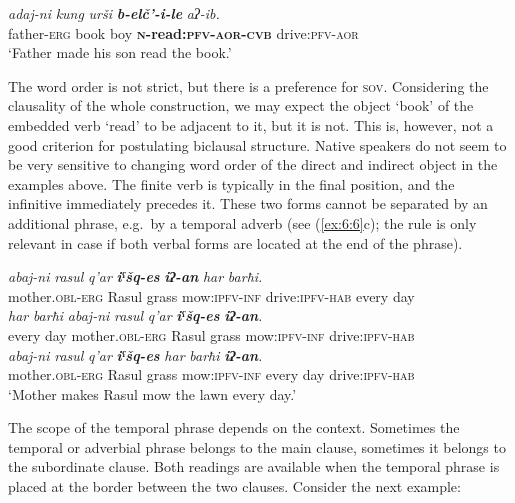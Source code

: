 ﻿\documentclass[output=paper]{langsci/langscibook}
\begin{document}
\ex %
\gll *\emph{adaj-ni} \emph{kung} \emph{urši} \emph{\textbf{b-elč'-i-le}}  \emph{aʔ-ib.}\\
father-\textsc{erg} book boy \textbf{\textsc{n}-read:\textsc{pfv}-\textsc{aor}-\textsc{cvb}} drive:\textsc{pfv}-\textsc{aor}\\
\glt `Father made his son read the book.'
\z
\z


The word order is not strict, but there is a preference for \textsc{sov}.
Considering the clausality of the whole construction, we may expect
the object `book' of the embedded verb `read' to be adjacent to it, but
it is not. This is, however, not a good criterion for postulating
biclausal structure. Native speakers do not seem to be very sensitive to
changing word order of the direct and indirect object in the examples
above. The finite verb is typically in the final position, and the
infinitive immediately precedes it. These two forms cannot be separated
by an additional phrase, e.g.\ by a temporal adverb (see (\ref{ex:6:6}c);
the rule is only relevant in case if both verbal forms are located at
the end of the phrase).


\ea \label{ex:6:6} %
\ea %
\gll \emph{abaj-ni} \emph{rasul} \emph{q'ar} \emph{\textbf{iˤšq-es}}  \emph{\textbf{iʔ-an}}  \emph{har} \emph{barħi.}\\
 mother.\textsc{obl}-\textsc{erg} Rasul grass mow:\textsc{ipfv}-\textsc{inf} drive:\textsc{ipfv}-\textsc{hab} every day\\


\ex %
\gll  \emph{har} \emph{barħi} \emph{abaj-ni}  \emph{rasul} \emph{q'ar} \emph{\textbf{iˤšq-es}}  \emph{\textbf{iʔ-an}.} \\
every day mother.\textsc{obl}-\textsc{erg} Rasul grass mow:\textsc{ipfv}-\textsc{inf} drive:\textsc{ipfv}-\textsc{hab}\\

\ex %
\gll *\emph{abaj-ni} \emph{rasul} \emph{q'ar} \emph{\textbf{iˤšq-es}}  \emph{har} \emph{barħi} \emph{\textbf{iʔ-an}.} \\
mother.\textsc{obl}-\textsc{erg} Rasul grass mow:\textsc{ipfv}-\textsc{inf} every day drive:\textsc{ipfv}-\textsc{hab}\\
\glt `Mother makes Rasul mow the lawn every day.'
\z
\z 

The scope of the temporal phrase depends on the context. Sometimes
the temporal or adverbial phrase belongs to the main clause, sometimes
it belongs to the subordinate clause. Both readings are available when
the temporal phrase is placed at the border between the two clauses.
Consider the next example:
\end{document}
